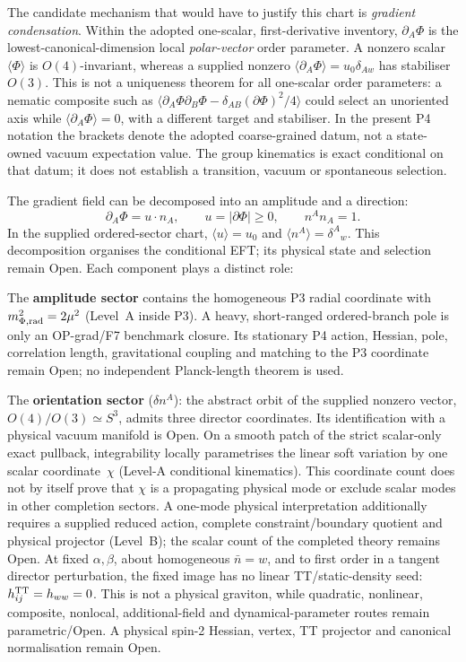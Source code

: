 \documentclass[11pt,a4paper]{article}
\begin{document}
The candidate mechanism that would have to justify this chart is
\emph{gradient condensation}.  Within the adopted one-scalar, first-derivative
inventory, $\partial_A\Phi$ is the lowest-canonical-dimension local
\emph{polar-vector} order parameter.  A nonzero scalar $\langle\Phi\rangle$
is $O(4)$-invariant, whereas a supplied nonzero
$\langle\partial_A\Phi\rangle=u_0\delta_{Aw}$ has stabiliser $O(3)$.  This is
not a uniqueness theorem for all one-scalar order parameters: a nematic
composite such as
$\langle\partial_A\Phi\partial_B\Phi
-\delta_{AB}(\partial\Phi)^2/4\rangle$ could select an unoriented axis while
$\langle\partial_A\Phi\rangle=0$, with a different target and stabiliser.  In
the present P4 notation the brackets denote the adopted coarse-grained datum,
not a state-owned vacuum expectation value.  The group kinematics is exact
conditional on that datum; it does not establish a transition, vacuum or
spontaneous selection.

The gradient field can be decomposed into an amplitude and a direction:
\begin{equation}
  \partial_A\Phi = u \cdot n_A,
  \qquad u = |\partial\Phi| \geq 0,
  \qquad n^A n_A = 1.
  \label{eq:pop_polar}
\end{equation}
In the supplied ordered-sector chart, $\langle u \rangle = u_0$ and $\langle n^A \rangle = \delta^A{}_w$. This decomposition organises the conditional EFT; its physical state and selection remain Open. Each component plays a distinct role:

The \textbf{amplitude sector} contains the homogeneous P3 radial coordinate
with $m_{\Phi,{\rm rad}}^2=2\mu^2$ (Level~A inside P3).  A heavy,
short-ranged ordered-branch pole is only an OP-grad/F7 benchmark closure.
Its stationary P4 action, Hessian, pole, correlation length, gravitational
coupling and matching to the P3 coordinate remain Open; no independent
Planck-length theorem is used.

The \textbf{orientation sector} ($\delta n^A$): the abstract orbit of the
supplied nonzero vector, $O(4)/O(3) \simeq S^3$, admits three director
coordinates.  Its identification with a physical vacuum manifold is Open. On a smooth
patch of the strict scalar-only exact pullback, integrability locally
parametrises the linear soft variation by one scalar coordinate~$\chi$
(Level-A conditional kinematics).  This coordinate count does not by itself
prove that $\chi$ is a propagating physical mode or exclude scalar modes in
other completion sectors.  A one-mode physical interpretation additionally
requires a supplied reduced action, complete constraint/boundary quotient and
physical projector (Level~B); the scalar count of the completed theory remains
Open.  At fixed $\alpha,\beta$, about homogeneous $\bar n=w$, and to first
order in a tangent director perturbation, the fixed image has no linear
TT/static-density seed: $h_{ij}^{\rm TT}=h_{ww}=0$.  This is not a physical
graviton, while quadratic, nonlinear, composite, nonlocal, additional-field
and dynamical-parameter routes remain parametric/Open.  A physical spin-2
Hessian, vertex, TT projector and canonical normalisation remain Open.
\end{document}
